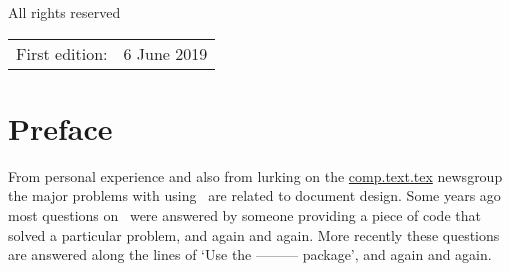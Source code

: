 \documentclass[10pt,a4paper,extrafontsizes]{memoir}
\newif\ifMASTER
\newcommand\svnidlong[4]{}
\begin{document}
All rights reserved



\begin{center}
\begin{tabular}{ll}
First edition:                        & 6 June 2019 \\

\end{tabular}
\end{center}
\ifMASTER
Manual last changed \svnyear/\svnmonth/\svnday
\fi

\endgroup

\clearpage

\pagestyle{headings}

\setupshorttoc
\tableofcontents
\clearpage
\setupparasubsecs
\setupmaintoc

\begingroup

%




\tableofcontents

\endgroup


\setlength{\unitlength}{1pt}
\clearpage
\listoffigures
\clearpage
\listoftables
\clearpage
\listofegresults




\svnidlong
{$Ignore: $}
{$LastChangedDate: 2014-11-05 16:28:11 +0100 (Wed, 05 Nov 2014) $}
{$LastChangedRevision: 501 $}
{$LastChangedBy: daleif $}

\chapter{Preface}

    From personal experience and also from lurking on the \url{comp.text.tex}
newsgroup the major problems with using \ltx\ are related to document
design. Some years ago most questions on \ctt\ were answered by
someone providing a piece of code that solved a particular problem, and
again and again. More recently these questions are answered along the
lines of `Use the ---------{} package', and again and again.
\end{document}
